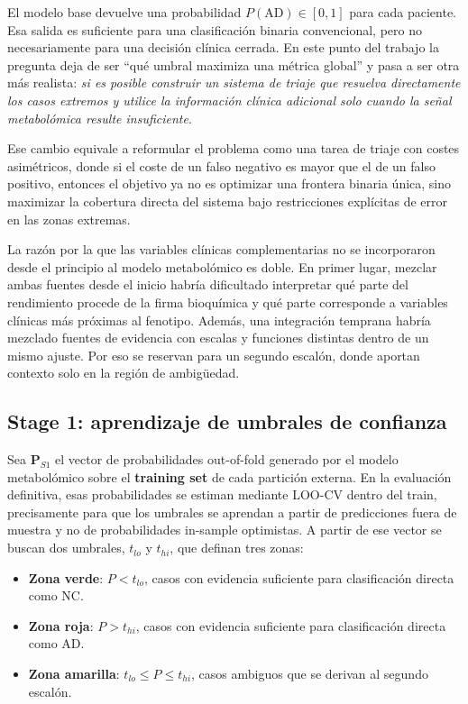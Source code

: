 El modelo base devuelve una probabilidad $P(\text{AD}) \in [0,1]$ para cada paciente. Esa salida es suficiente para una
clasificación binaria convencional, pero no necesariamente para una decisión clínica cerrada. En este punto del trabajo
la pregunta deja de ser ``qué umbral maximiza una métrica global'' y pasa a ser otra más realista: \textit{si es posible construir un sistema de triaje que resuelva directamente los casos extremos y utilice la información clínica adicional solo cuando la señal metabolómica resulte insuficiente}.

Ese cambio equivale a reformular el problema como una tarea de triaje con costes asimétricos, donde si el coste de un falso
negativo es mayor que el de un falso positivo, entonces el objetivo ya no es optimizar una frontera binaria única, sino
maximizar la cobertura directa del sistema bajo restricciones explícitas de error en las zonas extremas.

La razón por la que las variables clínicas complementarias no se incorporaron desde el principio al modelo metabolómico
es doble. En primer lugar, mezclar ambas fuentes desde el inicio habría dificultado interpretar qué parte del
rendimiento procede de la firma bioquímica y qué parte corresponde a variables clínicas más próximas al fenotipo.
Además, una integración temprana habría mezclado fuentes de evidencia con escalas y funciones distintas dentro de un
mismo ajuste. Por eso se reservan para un segundo escalón, donde aportan contexto solo en la región de ambigüedad.

\subsection{Stage 1: aprendizaje de umbrales de confianza}

Sea $\mathbf{P}_{S1}$ el vector de probabilidades out-of-fold generado por el modelo metabolómico sobre el \textbf{training set} de cada partición externa. En la evaluación definitiva, esas probabilidades se estiman mediante LOO-CV dentro del train, precisamente para que los umbrales se aprendan a partir de predicciones fuera de muestra y no de probabilidades in-sample optimistas. A partir de ese vector se buscan dos umbrales, $t_{lo}$ y $t_{hi}$, que definan tres zonas:

\begin{itemize}
    \item \textbf{Zona verde}: $P < t_{lo}$, casos con evidencia suficiente para clasificación directa como NC.
    \item \textbf{Zona roja}: $P > t_{hi}$, casos con evidencia suficiente para clasificación directa como AD.
    \item \textbf{Zona amarilla}: $t_{lo} \leq P \leq t_{hi}$, casos ambiguos que se derivan al segundo escalón.
\end{itemize}

